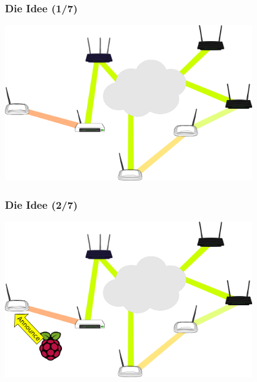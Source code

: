 \documentclass[accentcolor=tud6b,colorbacktitle,inverttitle,landscape,german,presentation,t]{tudbeamer}
\begin{document}
	\begin{frame}
		\frametitle{Die Idee (1/7)}
		\begin{center}
			\vspace{0cm}
			\includegraphics[width=0.8\textwidth]{images/service-discovery1}
			\vspace{0.4cm}
		\end{center}

	\end{frame}
	\begin{frame}
		\frametitle{Die Idee (2/7)}
		\begin{center}
			\vspace{0cm}
			\includegraphics[width=0.8\textwidth]{images/service-discovery2}
			\vspace{0.4cm}
		\end{center}
		
	\end{frame}
\end{document}
